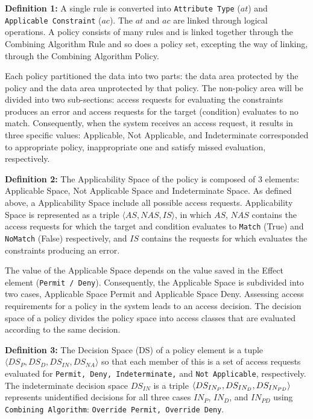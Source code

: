 \documentclass[conference]{IEEEtran}
\begin{document}
\textbf{Definition 1:} 
A single rule is converted into \texttt{Attribute Type} ($at$) and \texttt{Applicable Constraint} ($ac$). 
The $at$ and $ac$ are linked through logical operations. 
A policy consists of many rules and is linked together through the Combining Algorithm Rule and so does a policy set, excepting the way of linking, through the Combining Algorithm Policy.

Each policy partitioned the data into two parts: the data area protected by the policy and the data area unprotected by that policy. 
The non-policy area will be divided into two sub-sections: access requests for evaluating the constraints produces an error and access requests for the target (condition) evaluates to no match. 
Consequently, when the system receives an access request, it results in three specific values: Applicable, Not Applicable, and Indeterminate corresponded to appropriate policy, inappropriate one and satisfy missed evaluation, respectively.

\textbf{Definition 2: }
The Applicability Space of the policy is composed of 3 elements: Applicable Space, Not Applicable Space and Indeterminate Space. 
As defined above, a Applicability Space include all possible access requests. 
Applicability Space is represented as a triple $\langle AS, NAS, IS \rangle$, in which  $AS$, $NAS$ contains the access requests for which the target and condition evaluates to \texttt{Match} (True) and \texttt{NoMatch} (False) respectively, and $IS$ contains the requests for %
which evaluates the constraints producing an error.

The value of the Applicable Space depends on the value saved in the Effect element (\texttt{Permit / Deny}). 
Consequently, the Applicable Space is subdivided into two cases, Applicable Space Permit and Applicable Space Deny. 
Assessing access requirements for a policy in the system leads to an access decision. 
The decision space of a policy divides the policy space into access classes that are evaluated according to the same decision.

\textbf{Definition 3: }
The Decision Space (DS) of a policy element is a tuple $\langle DS_P, DS_D, DS_{IN}, DS_{NA} \rangle$ so that each member of this is a set of access requests evaluated for \texttt{Permit, Deny, Indeterminate,} and \texttt{Not Applicable}, respectively. 
The indeterminate decision space $DS_{IN}$ is a triple $ \langle DS_{IN_{P}}, DS_{IN_{D}}, \\DS_{IN_{PD}} \rangle$ represents unidentified decisions for all three cases $IN_P$, $IN_D$, and $IN_{PD}$ using \texttt{Combining Algorithm}: \texttt{Override Permit, Override Deny}.
\end{document}
